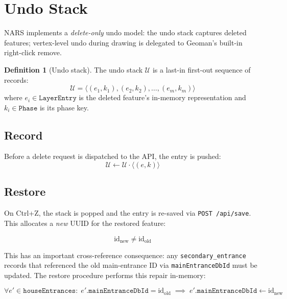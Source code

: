 \documentclass[12pt,a4paper]{article}
\theoremstyle{definition}
\newtheorem{definition}{Definition}[section]
\theoremstyle{plain}
\theoremstyle{remark}
\begin{document}
\section{Undo Stack}
\label{sec:undo}

NARS implements a \emph{delete-only} undo model: the undo stack captures
deleted features; vertex-level undo during drawing is delegated to Geoman's
built-in right-click remove.

\begin{definition}[Undo stack]
The undo stack $\mathcal{U}$ is a last-in first-out sequence of records:
\begin{equation}
  \mathcal{U} = \langle (e_1, k_1), (e_2, k_2), \ldots, (e_m, k_m) \rangle
  \label{eq:undo_stack}
\end{equation}
where $e_i \in \texttt{LayerEntry}$ is the deleted feature's in-memory
representation and $k_i \in \texttt{Phase}$ is its phase key.
\end{definition}

\subsection{Record}

Before a delete request is dispatched to the API, the entry is pushed:
\begin{equation}
  \mathcal{U} \leftarrow \mathcal{U} \cdot \langle (e, k) \rangle
  \label{eq:undo_push}
\end{equation}

\subsection{Restore}

On Ctrl+Z, the stack is popped and the entry is re-saved via
\texttt{POST /api/save}. This allocates a \emph{new} UUID for the
restored feature:

\begin{equation}
  \text{id}_{\text{new}} \neq \text{id}_{\text{old}}
  \label{eq:undo_new_id}
\end{equation}

This has an important cross-reference consequence: any
\texttt{secondary\_entrance} records that referenced the old main-entrance
ID via \texttt{mainEntranceDbId} must be updated. The restore procedure
performs this repair in-memory:

\begin{equation}
  \forall e' \in \texttt{houseEntrances}:\;
  e'.\texttt{mainEntranceDbId} = \text{id}_{\text{old}}
  \;\implies\;
  e'.\texttt{mainEntranceDbId} \leftarrow \text{id}_{\text{new}}
  \label{eq:undo_ref_repair}
\end{equation}
\end{document}

